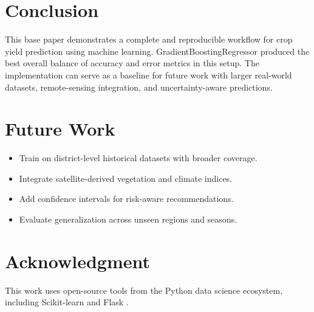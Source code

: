 \documentclass[conference]{IEEEtran}
\begin{document}
\section{Conclusion}
This base paper demonstrates a complete and reproducible workflow for crop yield prediction using machine learning. GradientBoostingRegressor produced the best overall balance of accuracy and error metrics in this setup. The implementation can serve as a baseline for future work with larger real-world datasets, remote-sensing integration, and uncertainty-aware predictions.

\section{Future Work}
\begin{itemize}
    \item Train on district-level historical datasets with broader coverage.
    \item Integrate satellite-derived vegetation and climate indices.
    \item Add confidence intervals for risk-aware recommendations.
    \item Evaluate generalization across unseen regions and seasons.
\end{itemize}

\section*{Acknowledgment}
This work uses open-source tools from the Python data science ecosystem, including Scikit-learn and Flask \cite{sklearn,flask}.



\end{document}
